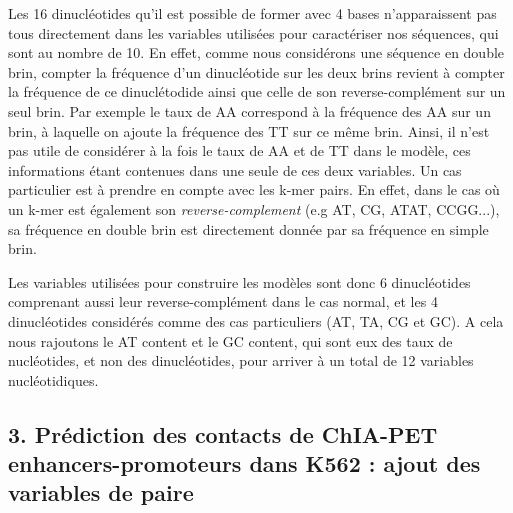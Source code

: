\documentclass[french]{llncs}
\begin{document}
Les 16 dinucléotides qu'il est possible de former avec 4 bases n'apparaissent pas tous directement dans les variables utilisées pour caractériser nos séquences, qui sont au nombre de 10. En effet, comme nous considérons une séquence en double brin, compter la fréquence d'un dinucléotide sur les deux brins revient à compter la fréquence de ce dinuclétodide ainsi que celle de son reverse-complément sur un seul brin. Par exemple le taux de AA correspond à la fréquence des AA sur un brin, à laquelle on ajoute la fréquence des TT sur ce même brin. Ainsi, il n'est pas utile de considérer à la fois le taux de AA et de TT dans le modèle, ces informations étant contenues dans une seule de ces deux variables. Un cas particulier est à prendre en compte avec les k-mer pairs. En effet, dans le cas où un k-mer est également son \textit{reverse-complement} (e.g AT, CG, ATAT, CCGG...), sa fréquence en double brin est directement donnée par sa fréquence en simple brin.

Les variables utilisées pour construire les modèles sont donc 6 dinucléotides comprenant aussi leur reverse-complément dans le cas normal, et les 4 dinucléotides considérés comme des cas particuliers (AT, TA, CG et GC). A cela nous rajoutons le AT content et le GC content, qui sont eux des taux de nucléotides, et non des dinucléotides, pour arriver à un total de 12 variables nucléotidiques.

\newpage

\subsection*{3. Prédiction des contacts de ChIA-PET enhancers-promoteurs dans K562 : ajout des variables de paire}
\end{document}
